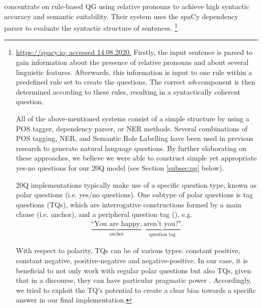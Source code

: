 \documentclass[11pt,a4paper]{article}
\begin{document}
\citet{KhullarEa2018} concentrate on rule-based QG using relative pronouns to achieve high syntactic accuracy and semantic suitability. 
Their system uses the spaCy dependency parser to evaluate the syntactic structure of sentences.%
	\footnote{\url{https://spacy.io; accessed 14.08.2020.}
Firstly, the input sentence is parsed to gain information about the presence of relative pronouns and about several linguistic features. 
Afterwards, this information is input to one rule within a predefined rule set to create the questions. 
The correct \textit{wh}-component is then determined according to these rules, resulting in a syntactically coherent question. 

All of the above-mentioned systems consist of a simple structure by using a POS tagger, dependency parser, or NER methods. 
Several combinations of POS tagging, NER, and Semantic Role Labelling have been used in previous research to generate natural language questions. 
By further elaborating on these approaches, we believe we were able to construct simple yet appropriate yes-no questions for our 20Q model (see Section \ref{subsec:qg} below). 


20Q implementations typically make use of a specific question type, known as polar questions (i.e. yes/no questions). One subtype of polar questions is tag questions (TQs), which are interrogative constructions formed by a main clause (i.e. anchor), and a peripheral question tag (\citealt{Bawden2017, Bonsignori2007,TottieEa2006}), e.g. 
\begin{gather*}
    \underbrace{\text{``You are happy,}}_{\text{anchor}}\ \underbrace{\text{aren't you?"}}_{\text{question tag}}. 
\end{gather*}

With respect to polarity, TQs can be of various types: constant positive, constant negative, positive-negative and negative-positive. In our case, it is beneficial to not only work with regular polar questions but also TQs, given that in a discourse, they can have particular pragmatic power \citep{TottieEa2006}. Accordingly, we tried to exploit the TQ’s potential to create a clear bias towards a specific answer in our final implementation. 

}
\end{document}
